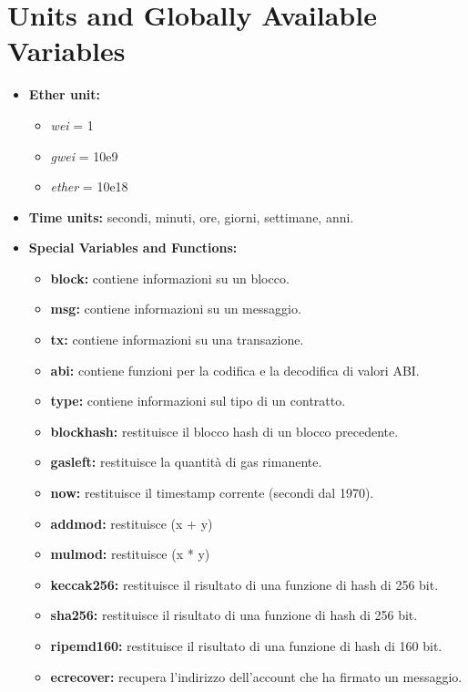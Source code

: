 \documentclass{article}
\begin{document}
        \section{Units and Globally Available Variables}
            \begin{itemize}
                \item \textbf{Ether unit:} 
                    \begin{itemize}
                        \item \textit{wei} = 1
                        \item \textit{gwei} = 10e9
                        \item \textit{ether} = 10e18
                    \end{itemize}

                \item \textbf{Time units:} secondi, minuti, ore, giorni, settimane, anni.
                
                \pagebreak

                \item \textbf{Special Variables and Functions:} 
                \begin{itemize}
                    \item \textbf{block:} contiene informazioni su un blocco.
                    \item \textbf{msg:} contiene informazioni su un messaggio.
                    \item \textbf{tx:} contiene informazioni su una transazione.
                    \item \textbf{abi:} contiene funzioni per la codifica e la decodifica di valori ABI.
                    \item \textbf{type:} contiene informazioni sul tipo di un contratto.
                    \item \textbf{blockhash:} restituisce il blocco hash di un blocco precedente.
                    \item \textbf{gasleft:} restituisce la quantità di gas rimanente.
                    \item \textbf{now:} restituisce il timestamp corrente (secondi dal 1970).
                    \item \textbf{addmod:} restituisce (x + y) %
                    \item \textbf{mulmod:} restituisce (x * y) %
                    \item \textbf{keccak256:} restituisce il risultato di una funzione di hash di 256 bit.
                    \item \textbf{sha256:} restituisce il risultato di una funzione di hash di 256 bit.
                    \item \textbf{ripemd160:} restituisce il risultato di una funzione di hash di 160 bit.
                    \item \textbf{ecrecover:} recupera l'indirizzo dell'account che ha firmato un messaggio.
                \end{itemize}
            \end{itemize}
\end{document}
